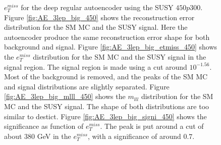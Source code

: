 \begin{figure}[H]
{    $e_T^{miss}$ for the deep regular autoencoder using the SUSY $450p300$. Figure \ref{fig:AE_3lep_big_450} shows the reconstruction error 
    distribution for the SM MC and the SUSY signal. Here the autoencoder produce the same reconstruction error shape for both background and 
    signal. Figure \ref{fig:AE_3lep_big_etmiss_450} shows the $e_T^{miss}$ distribution for the SM MC and the SUSY signal in the signal region. 
    The signal region is made using a cut around $10^{-1.56}$. Most of the background is removed, and the peaks of the SM MC and signal 
    distributions are slightly separated. Figure \ref{fig:AE_3lep_big_mlll_450} shows the $m_{lll}$ distribution for the SM MC and the SUSY signal. 
    The shape of both distributions are too similar to destict. Figure \ref{fig:AE_3lep_big_signi_450} shows the significance as function of
    $e_T^{miss}$. The peak is put around a cut of about 380 GeV in the $e_T^{miss}$, with a significance of around $0.7$.}
    \label{fig:AE_3lep_big_rec_sig_signi_450}
\end{figure}

